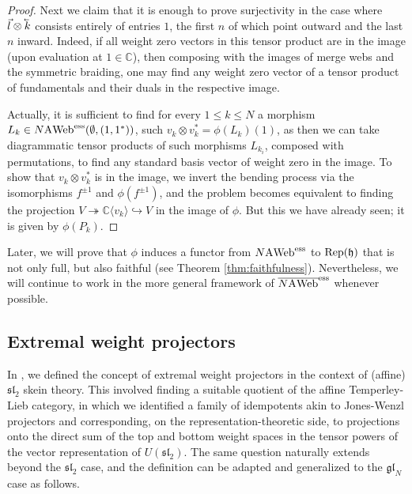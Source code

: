 \documentclass[11pt]{article}
\theoremstyle{definition}
\numberwithin{equation}{section}
\newcommand{\slnn}[1]{\mf{sl}_{#1}}
\newcommand{\glnn}[1]{\mf{gl}_{#1}}
\def\mf{\mathfrak}
\def\C{{\mathbb C}}
\newcommand{\reph}{\Rep(\h)}
\def\h{{\mathfrak h}}
\newcommand{\Rep}{\cat{Rep}}
\newcommand{\cat}[1]{\ensuremath{\mbox{\bfseries {\upshape {#1}}}}}
\newcommand{\AWeb}[1][]{#1\cat{A}\cat{Web}}
\newcommand{\essAWeb}[1][]{#1\AWeb^{\mathrm{ess}}}
\newcommand{\essbAWeb}[1][]{\overline{#1\AWeb}^{\mathrm{ess}}}
\newcommand{\cev}[1]{\reflectbox{\ensuremath{\vec{\reflectbox{\ensuremath{#1}}}}}}
\def\la{\langle}
\def\ra{\rangle}
\begin{document}
\begin{proof}
    Next we claim that it is enough to prove surjectivity in the case where
    $\vec{l}\otimes \cev{k}$ consists entirely of entries $1$, the first $n$ of
    which point outward and the last $n$ inward. Indeed, if all weight zero
    vectors in this tensor product are in the image (upon evaluation at $1\in
    \C$), then composing with the images of merge webs and the symmetric
    braiding, one may find any weight zero vector of a tensor product of
    fundamentals and their duals in the respective image.
    
Actually, it is sufficient to find for every $1\leq k\leq N$ a morphism $L_k\in
\essAWeb[N](\emptyset,(1,1^*))$, such $v_k\otimes v_k^*=\phi(L_k)(1)$, as then
we can take diagrammatic tensor products of such morphisms $L_{k_i}$, composed
with permutations, to find any standard basis vector of weight zero in the
image. To show that $v_k\otimes v_k^*$ is in the image, we invert the bending
process via the isomorphisms $f^{\pm 1}$ and $\phi(f^{\pm 1})$, and the problem
becomes equivalent to finding the projection $V \twoheadrightarrow \C\la
v_k\ra\hookrightarrow V$ in the image of $\phi$. But this we have already seen;
it is given by $\phi(P_k)$.
\end{proof}


Later, we will prove that $\phi$ induces a functor from $\essAWeb[N]$ to $\reph$
that is not only full, but also faithful (see Theorem \ref{thm:faithfulness}).
Nevertheless, we will continue to work in the more general framework of
$\essbAWeb[N]$ whenever possible.



\subsection{Extremal weight projectors}
\label{sec:EWP}
In \cite{QW}, we defined the concept of extremal weight projectors in the
context of (affine) $\slnn{2}$ skein theory. This involved finding a suitable
quotient of the affine Temperley-Lieb category, in which we identified a family
of idempotents akin to Jones-Wenzl projectors and corresponding, on the
representation-theoretic side, to projections onto the direct sum of the top and
bottom weight spaces in the tensor powers of the vector representation of
$U(\slnn{2})$. The same question naturally extends beyond the $\slnn{2}$ case,
and the definition can be adapted and generalized to the $\glnn{N}$ case as
follows.
\end{document}
